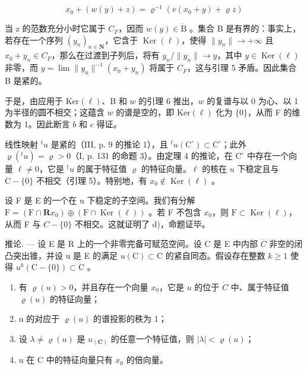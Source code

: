 \[
x _ {0} + (w (y) + z) = \varrho^ {- 1} (v (x _ {0} + y) + \varrho z)
\]

当 z 的范数充分小时它属于 \(C_{F}\)，因而 \(w(y) \in \mathring{\mathrm{B}}\) 。集合 B 是有界的：事实上，若存在一个序列 \((y_{n})_{n \in \mathbf{N}}\)，它含于 \(\operatorname{Ker}(\ell)\)，使得 \(\|y_{n}\| \to +\infty\) 且 \(x_{0} + y_{n} \in C_{F}\)，那么在过渡到子列后，将有 \(y_{n}/\|y_{n}\| \to y\)，其中 \(y \in \operatorname{Ker}(\ell)\) 非零，而 \(y = \lim \|y_{n}\|^{-1}(x_{0} + y_{n})\) 将属于 \(C_{F}\)，这与引理 5 矛盾。因此集合 B 是紧的。

于是，由应用于 \(\mathrm{Ker}(\ell)\)、B 和 \(w\) 的引理 6 推出，\(w\) 的复谱与以 0 为心、以 1 为半径的圆不相交；这蕴含 \(w\) 的谱是空的，即 \(\mathrm{Ker}(\ell)\) 化为 \(\{0\}\)，从而 F 的维数为 1。因此断言 \(b\) 和 \(c\) 得证。

线性映射 \({}^t u\) 是紧的（III, p. 9 的推论 1），且 \({}^t u(\mathrm{C}^\circ) \subset \mathrm{C}^\circ\)；此外 \(\varrho(^t u) = \varrho > 0\)（I, p. 131 的命题 3）。由定理 4 的推论，在 \(\mathrm{C}^\circ\) 中存在一个向量 \(\ell \neq 0\)，它是 \({}^t u\) 的属于特征值 \(\varrho\) 的特征向量。\(\ell\) 的核在 \(u\) 下稳定且与 \(\mathrm{C} - \{0\}\) 不相交（引理 5）。特别地，有 \(x_0 \notin \operatorname{Ker}(\ell)\) 。

设 F 是 E 的一个在 u 下稳定的子空间。我们有分解 \(\mathrm{F} = (\mathrm{F} \cap \mathbf{R}x_{0}) \oplus (\mathrm{F} \cap \operatorname{Ker}(\ell))\) 。若 F 不包含 \(x_{0}\)，则 \(\mathrm{F} \subset \operatorname{Ker}(\ell)\)，从而 F 与 \(C - \{0\}\) 不相交。这就证明了 d)，命题证毕。

推论. --- 设 E 是 R 上的一个非零完备可赋范空间。设 C 是 E 中内部 \(\dot{C}\) 非空的闭凸突出锥，并设 u 是 E 的满足 \(u(\mathrm{C}) \subset \mathrm{C}\) 的紧自同态。假设存在整数 \(k \geqslant 1\) 使得 \(u^{k}(\mathrm{C} - \{0\}) \subset \mathring{\mathrm{C}}\) 。

\begin{enumerate}
\def\labelenumi{\alph{enumi})}
\item
  有 \(\varrho(u) > 0\)，并且存在一个向量 \(x_0\)，它是 \(u\) 的位于 \(\dot{C}\) 中、属于特征值 \(\varrho(u)\) 的特征向量；
\item
  u 的对应于 \(\varrho(u)\) 的谱投影的秩为 1；
\item
  设 \(\lambda \neq \varrho(u)\) 是 \(u_{(\mathbf{C})}\) 的任意一个特征值，则 \(|\lambda| < \varrho(u)\)；
\item
  u 在 C 中的特征向量只有 \(x_0\) 的倍向量。
\end{enumerate}


